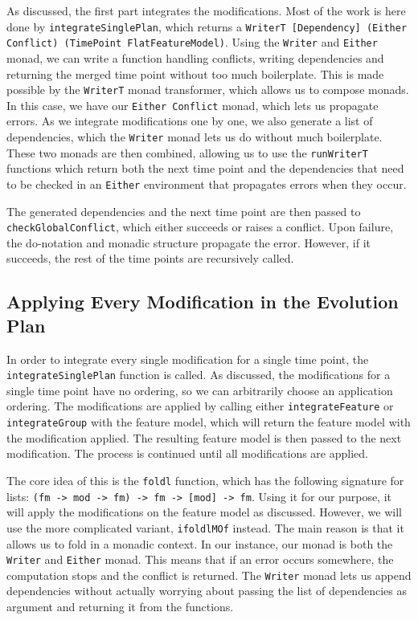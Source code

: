 \documentclass[a4paper,english]{ifimaster}
\begin{document}
As discussed, the first part integrates the modifications. Most of the work is here done by \texttt{integrate\-Single\-Plan}, which returns a \texttt{WriterT [Dependency] (Either Conflict) (TimePoint FlatFeatureModel)}. Using the \texttt{Writer} and \texttt{Either} monad, we can write a function handling conflicts, writing dependencies and returning the merged time point without too much boilerplate. This is made possible by the \texttt{WriterT} monad transformer, which allows us to compose monads. In this case, we have our \texttt{Either Conflict} monad, which lets us propagate errors. As we integrate modifications one by one, we also generate a list of dependencies, which the \texttt{Writer} monad lets us do without much boilerplate. These two monads are then combined, allowing us to use the \texttt{runWriterT} functions which return both the next time point and the dependencies that need to be checked in an \texttt{Either} environment that propagates errors when they occur.

The generated dependencies and the next time point are then passed to \texttt{check\-Global\-Conflict}, which either succeeds or raises a conflict. Upon failure, the do-notation and monadic structure propagate the error. However, if it succeeds, the rest of the time points are recursively called.

\subsection{Applying Every Modification in the Evolution Plan}%
\label{sub:applying_modifications}

In order to integrate every single modification for a single time point, the \texttt{integrate\-Single\-Plan} function is called. As discussed, the modifications for a single time point have no ordering, so we can arbitrarily choose an application ordering. The modifications are applied by calling either \texttt{integrate\-Feature} or \texttt{integrate\-Group} with the feature model, which will return the feature model with the modification applied. The resulting feature model is then passed to the next modification. The process is continued until all modifications are applied.

The core idea of this is the \texttt{foldl} function, which has the following signature for lists: \texttt{(fm -> mod -> fm) -> fm -> [mod] -> fm}. Using it for our purpose, it will apply the modifications on the feature model as discussed. However, we will use the more complicated variant, \texttt{ifoldlMOf} instead. The main reason is that it allows us to fold in a monadic context. In our instance, our monad is both the \texttt{Writer} and \texttt{Either} monad. This means that if an error occurs somewhere, the computation stops and the conflict is returned. The \texttt{Writer} monad lets us append dependencies without actually worrying about passing the list of dependencies as argument and returning it from the functions.
\end{document}
